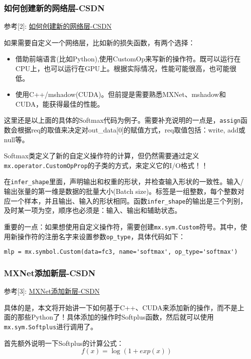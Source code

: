 \subsubsection{如何创建新的网络层-CSDN}

参考[2]: \href{https://blog.csdn.net/xuezhisdc/article/details/54927635}{如何创建新的网络层-CSDN}

如果需要自定义一个网络层，比如新的损失函数，有两个选择：
\begin{itemize}
\item 借助前端语言(比如Python),使用CustomOp来写新的操作符。既可以运行在CPU上，也可以运行在GPU上。根据实际情况，性能可能很高，也可能很低。
\item 使用C++/mshadow(CUDA)。但前提是需要熟悉MXNet、mshadow和CUDA，能获得最佳的性能。
\end{itemize}

这里还是以上面的具体的Softmax代码为例子。需要补充说明的一点是，\verb|assign|函数会根据req的取值来决定对out\_data[0]的赋值方式，req取值包括：write, add或null等。

Softmax类定义了新的自定义操作符的计算，但仍然需要通过定义\verb|mx.operator.CustomOpProp|的子类的方式，来定义它的I/O格式！！

在\verb|infer_shape|里面，声明输出和权重的形状，并检查输入形状的一致性。输入/输出张量的第一维是数据的批量大小(Batch size)。标签是一组整数，每个整数对应一个样本，并且输出、输入的形状相同。函数\verb|infer_shape|的输出是三个列别，及时某一项为空，顺序也必须是：输入、输出和辅助状态。

重要的一点：如果想使用自定义操作符，需要创建\verb|mx.sym.Custom|符号。其中，使用新操作符的注册名字来设置参数\verb|op_type|，具体代码如下：
\begin{verbatim}
mlp = mx.symbol.Custom(data=fc3, name='softmax', op_type='softmax')
\end{verbatim}

\subsubsection{MXNet添加新层-CSDN}

参考[3]: \href{https://blog.csdn.net/qq_20965753/article/details/66975622}{MXNet添加新层-CSDN}

具体的是，本文将开始讲一下如何基于C++、CUDA来添加新的操作，而不是上面的那些Python了！具体添加的操作时Softplus函数，然后就可以使用\verb|mx.sym.Softplus|进行调用了。

首先额外说明一下Softplus的计算公式：
\begin{displaymath}
f(x) = \log (1 + exp(x))
\end{displaymath}

